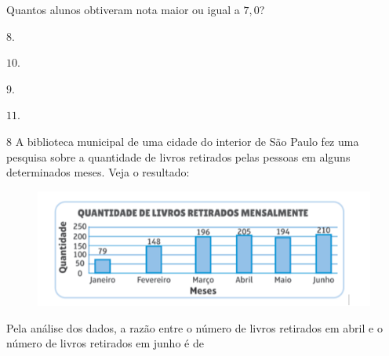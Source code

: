 Quantos alunos obtiveram nota maior ou igual a $7,0$?

\begin{escolha}
\item $8$.
\item $10$.
\item $9$.
\item $11$.
\end{escolha}



\num{8}  A biblioteca municipal de uma cidade do interior de São Paulo fez uma
pesquisa sobre a quantidade de livros retirados pelas pessoas em alguns
determinados meses. Veja o resultado:

\begin{figure}[H]
\centering
\includegraphics[width=.7\textwidth]{./imgSAEB_6_MAT/media/image117.png}
\end{figure}

Pela análise dos dados, a razão entre o número de livros retirados em
abril e o número de livros retirados em junho é de


